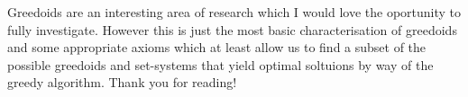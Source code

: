 \documentclass[../main.tex]{subfiles}
\begin{document}
Greedoids are an interesting area of research which I would love the oportunity to fully investigate. However this is just the most basic characterisation of greedoids and some appropriate axioms which at least allow us to find a subset of the possible greedoids and set-systems that yield optimal soltuions by way of the greedy algorithm. Thank you for reading!
\end{document}
